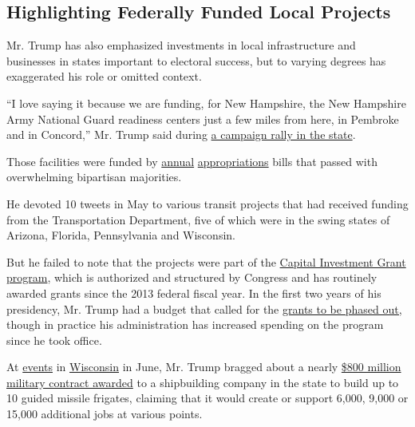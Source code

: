 \hypertarget{highlighting-federally-funded-local-projects}{%
\subsection{Highlighting Federally Funded Local
Projects}\label{highlighting-federally-funded-local-projects}}

Mr. Trump has also emphasized investments in local infrastructure and
businesses in states important to electoral success, but to varying
degrees has exaggerated his role or omitted context.

``I love saying it because we are funding, for New Hampshire, the New
Hampshire Army National Guard readiness centers just a few miles from
here, in Pembroke and in Concord,'' Mr. Trump said during
\href{https://www.c-span.org/video/?468493-1/president-trump-holds-rally-manchester-hampshire}{a
campaign rally in the state}.

Those facilities were funded by
\href{https://www.congress.gov/bill/116th-congress/senate-bill/1790/text/enr}{annual}
\href{https://www.congress.gov/bill/115th-congress/house-bill/5895/text/enr}{appropriations}
bills that passed with overwhelming bipartisan majorities.

He devoted 10 tweets in May to various transit projects that had
received funding from the Transportation Department, five of which were
in the swing states of Arizona, Florida, Pennsylvania and Wisconsin.

But he failed to note that the projects were part of the
\href{https://www.transit.dot.gov/funding/grant-programs/capital-investments/current-capital-investment-grant-cig-projects}{Capital
Investment Grant program}, which is authorized and structured by
Congress and has routinely awarded grants since the 2013 federal fiscal
year. In the first two years of his presidency, Mr. Trump had a budget
that called for the
\href{https://crsreports.congress.gov/product/pdf/R/R46191\#page=10}{grants
to be phased out,} though in practice his administration has increased
spending on the program since he took office.

At
\href{https://www.rev.com/blog/transcripts/donald-trump-town-hall-transcript-with-sean-hannity-june-25}{events}
in
\href{https://www.whitehouse.gov/briefings-statements/remarks-president-trump-fincantieri-marinette-marine-marinette-wi/}{Wisconsin}
in June, Mr. Trump bragged about a nearly
\href{https://www.defense.gov/Newsroom/Contracts/Contract/Article/2171906/}{\$800
million military contract awarded} to a shipbuilding company in the
state to build up to 10 guided missile frigates, claiming that it would
create or support 6,000, 9,000 or 15,000 additional jobs at various
points.

